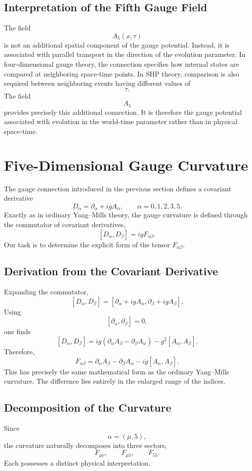 \subsection{Interpretation of the Fifth Gauge Field}
The field
\[A_5(x,\tau)\]
is not an additional spatial component of the gauge potential.
Instead,
it is associated with parallel transport in the direction of the
evolution parameter.
In four-dimensional gauge theory,
the connection specifies how internal states are compared at neighboring
space-time points.
In SHP theory,
comparison is also required between neighboring events having different
values of
\[\tau.\]
The field
\[A_5\]
provides precisely this additional connection.
It is therefore the gauge potential associated with evolution in the
world-time parameter rather than in physical space-time.
\section{Five-Dimensional Gauge Curvature}
The gauge connection introduced in the previous section defines a
covariant derivative
\[D_\alpha=\partial_\alpha+igA_\alpha,\qquad\alpha=0,1,2,3,5.\]
Exactly as in ordinary Yang--Mills theory, the gauge curvature is defined
through the commutator of covariant derivatives,
\[\boxed{[D_\alpha,D_\beta]=igF_{\alpha\beta}.}\]
Our task is to determine the explicit form of the tensor
\(F_{\alpha\beta}\).
\subsection{Derivation from the Covariant Derivative}
Expanding the commutator,
\[[D_\alpha,D_\beta]=[\partial_\alpha+igA_\alpha, \partial_\beta+igA_\beta].\]
Using
\[[\partial_\alpha,\partial_\beta]=0,\]
one finds
\[[D_\alpha,D_\beta]=ig(\partial_\alpha A_\beta-\partial_\beta A_\alpha)
-g^2[A_\alpha,A_\beta].\]
Therefore,
\[\boxed{F_{\alpha\beta}=\partial_\alpha A_\beta
-\partial_\beta A_\alpha-ig[A_\alpha,A_\beta].}\]
This has precisely the same mathematical form as the ordinary
Yang--Mills curvature.
The difference lies entirely in the enlarged range of the indices.
\subsection{Decomposition of the Curvature}
Since
\[\alpha=(\mu,5),\]
the curvature naturally decomposes into three sectors,
\[F_{\mu\nu},\qquad F_{\mu5},\qquad F_{55}.\]
Each possesses a distinct physical interpretation.
